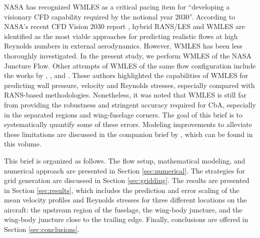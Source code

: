 \documentclass{ctr}
\begin{document}
NASA has recognized WMLES as a critical pacing item for ``developing a
visionary CFD capability required by the notional year
2030''. According to NASA's recent CFD Vision 2030 report
\citep{Slotnick2014}, hybrid RANS/LES \citep{Spalart1997, Spalart2009}
and WMLES \citep{Bose2018} are identified as the most viable
approaches for predicting realistic flows at high Reynolds numbers in
external aerodynamics. However, WMLES has been less thoroughly
investigated. In the present study, we perform WMLES of the NASA
Juncture Flow. Other attempts of WMLES of the same flow configuration
include the works by \cite{Iyer2020}, \cite{Ghate2020}, and
\cite{Lozano_AIAA_2020}.  These authors highlighted the capabilities
of WMLES for predicting wall pressure, velocity and Reynolds stresses,
especially compared with RANS-based methodologies. Nonetheless, it was
noted that WMLES is still far from providing the robustness and
stringent accuracy required for CbA, especially in the separated
regions and wing-fuselage corners. The goal of this brief is to
systematically quantify some of these errors. Modeling improvements to
alleviate these limitations are discussed in the companion brief by
\cite{Lozano_brief_2020_2}, which can be found in this volume.


This brief is organized as follows. The flow setup, mathematical
modeling, and numerical approach are presented in Section
\ref{sec:numerical}. The strategies for grid generation are discussed
in Section \ref{sec:gridding}. The results are presented in Section
\ref{sec:results}, which includes the prediction and error scaling of
the mean velocity profiles and Reynolds stresses for three different
locations on the aircraft: the upstream region of the fuselage, the
wing-body juncture, and the wing-body juncture close to the
trailing edge. Finally, conclusions are offered in Section
\ref{sec:conclusions}.
\end{document}
